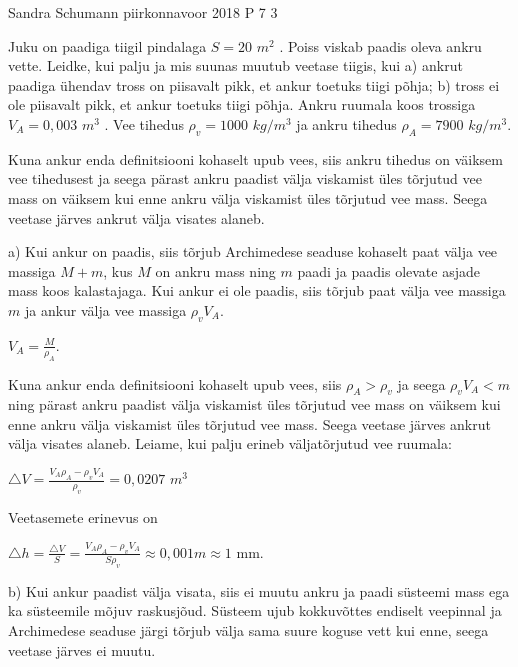 {Sandra Schumann} %
{piirkonnavoor} %
{2018} %
{P 7} %
{3} %
{

\ifStatement
Juku on paadiga tiigil pindalaga $S = 20$ $m^2$ . Poiss viskab paadis oleva ankru vette. Leidke, kui palju ja mis suunas muutub veetase tiigis, kui 
\newline
a) ankrut paadiga ühendav tross on piisavalt pikk, et ankur toetuks tiigi põhja;
\newline
b) tross ei ole piisavalt pikk, et ankur toetuks tiigi põhja. Ankru ruumala koos trossiga $V_A = 0,003$ $m^3$ . Vee tihedus $\rho_v = 1000$ $kg/m^3$ ja ankru tihedus $\rho_A = 7900$ $kg/m^3$.
\fi

\ifHint
Kuna ankur enda definitsiooni kohaselt upub vees, siis ankru tihedus on väiksem vee tihedusest ja seega  pärast ankru paadist välja viskamist üles tõrjutud vee mass on väiksem kui enne ankru välja viskamist üles tõrjutud vee mass. Seega veetase järves ankrut välja visates alaneb.
\fi

\ifSolution
a) Kui ankur on paadis, siis tõrjub Archimedese seaduse kohaselt paat välja vee massiga $M + m$, kus $M$ on ankru mass ning $m$ paadi ja paadis olevate asjade mass koos kalastajaga. Kui ankur ei ole paadis, siis tõrjub paat välja vee massiga $m$ ja ankur välja vee massiga $\rho_v V_A$.
\begin{center}
$V_A = \frac{M}{\rho_A}$.
\end{center}
Kuna ankur enda definitsiooni kohaselt upub vees, siis $\rho_A > \rho_v$ ja seega $\rho_v V_A < m$ ning pärast ankru paadist välja viskamist üles tõrjutud vee mass on väiksem kui enne ankru välja viskamist üles tõrjutud vee mass. Seega veetase järves ankrut välja visates alaneb. Leiame, kui palju erineb väljatõrjutud vee ruumala:
\begin{center}
$\triangle V =\frac{ V_A \rho_A - \rho_v V_A}{\rho_v} = 0,0207$ $m^3$ 
\end{center}
Veetasemete erinevus on
\begin{center}
$\triangle h = \frac{\triangle V}{S} = \frac{V_A \rho_A - \rho_v V_A}{S\rho_v} \approx 0,001 m \approx 1$ mm.
\end{center}
b) Kui ankur paadist välja visata, siis ei muutu ankru ja paadi süsteemi mass ega ka süsteemile mõjuv raskusjõud. Süsteem ujub kokkuvõttes endiselt veepinnal ja Archimedese seaduse järgi tõrjub välja sama suure koguse vett kui enne, seega veetase järves ei muutu.
\fi
}